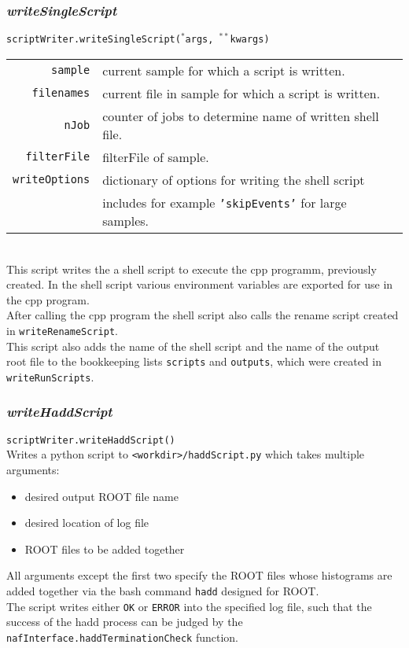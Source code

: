 \documentclass[12pt, a4paper]{article}
\newcommand{\args}{$^*$args}
\newcommand{\kwargs}{$^{**}$kwargs}
\begin{document}
\subsubsection{\textit{writeSingleScript}}
\texttt{scriptWriter.writeSingleScript(\args, \kwargs)}\\
\begin{tabular}{r|l}
\hline
\texttt{sample}			& current sample for which a script is written.\\
\texttt{filenames}		& current file in sample for which a script is written.\\
\texttt{nJob}			& counter of jobs to determine name of written shell file.\\
\texttt{filterFile}		& filterFile of sample.\\
\texttt{writeOptions}	& dictionary of options for writing the shell script\\
						& includes for example \texttt{'skipEvents'} for large samples.\\
\hline
\end{tabular}
\\
This script writes the a shell script to execute the cpp programm, previously created. In the shell script various environment variables are exported for use in the cpp program.\\
After calling the cpp program the shell script also calls the rename script created in \texttt{writeRenameScript}.\\
This script also adds the name of the shell script and the name of the output root file to the bookkeeping lists \texttt{scripts} and \texttt{outputs}, which were created in \texttt{writeRunScripts}.



\subsubsection{\textit{writeHaddScript}}
\texttt{scriptWriter.writeHaddScript()}\\
Writes a python script to \texttt{<workdir>/haddScript.py} which takes multiple arguments:
\begin{itemize}
\itemsep-0.5em
\item desired output ROOT file name
\item desired location of log file
\item ROOT files to be added together
\end{itemize}
All arguments except the first two specify the ROOT files whose histograms are added together via the bash command \texttt{hadd} designed for ROOT.\\
The script writes either \texttt{OK} or \texttt{ERROR} into the specified log file, such that the success of the hadd process can be judged by the \texttt{nafInterface.haddTerminationCheck} function.
\end{document}
